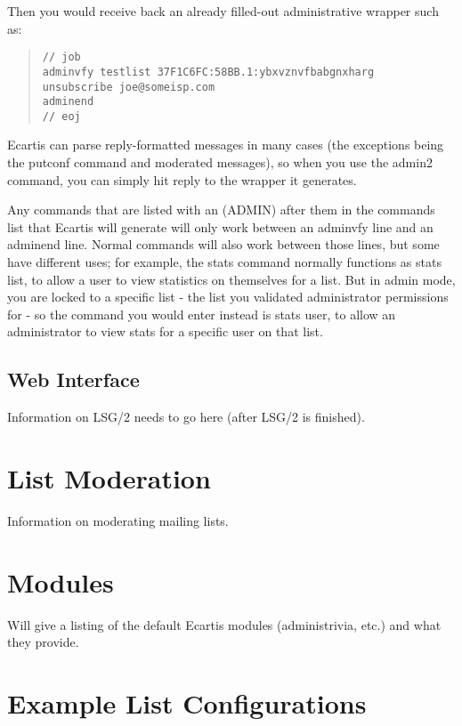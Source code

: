 \documentclass{book}
\begin{document}
Then you would receive back an already filled-out administrative wrapper such
as:
   
   
\begin{quote}
\footnotesize
\begin{verbatim}
// job
adminvfy testlist 37F1C6FC:58BB.1:ybxvznvfbabgnxharg
unsubscribe joe@someisp.com
adminend
// eoj
\end{verbatim}
\end{quote}
   
   
Ecartis can parse reply-formatted messages in many cases (the exceptions being
the putconf command and moderated messages), so when you use the admin2
command, you can simply hit reply to the wrapper it generates.
   
Any commands that are listed with an (ADMIN) after them in the commands list
that Ecartis will generate will only work between an adminvfy line and an
adminend line.  Normal commands will also work between those lines, but some
have different uses; for example, the stats command normally functions as
stats list, to allow a user to view statistics on themselves for a list.  But
in admin mode, you are locked to a specific list - the list you validated
administrator permissions for - so the command you would enter instead is
stats user, to allow an administrator to view stats for a specific user on
that list.
   
\section{Web Interface}
\label{interface:lsg2}

Information on LSG/2 needs to go here (after LSG/2 is finished).
   
\chapter{List Moderation}
\label{moderation}

Information on moderating mailing lists.
   
\chapter{Modules}

   
Will give a listing of the default Ecartis modules (administrivia, etc.) and
what they provide.
   
   
\chapter{Example List Configurations}
\end{document}

